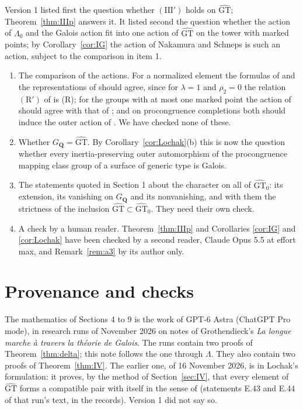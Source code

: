 \documentclass[11pt,a4paper]{article}
\theoremstyle{plain}
\theoremstyle{definition}
\theoremstyle{remark}
\newcommand{\GT}{\widehat{\mathrm{GT}}}
\newcommand{\GTz}{\widehat{\mathrm{GT}}_0}
\newcommand{\GQ}{G_{\mathbf Q}}
\begin{document}
Version 1 listed first the question whether $(\mathrm{III}')$ holds on $\GT$; Theorem~\ref{thm:IIIp} answers it.
It listed second the question whether the action of $\Lambda_0$ and the Galois action fit into one action of $\GT$
on the tower with marked points; by Corollary~\ref{cor:IG} the action of Nakamura and Schneps is such an action,
subject to the comparison in item 1.
\begin{enumerate}
\item The comparison of the actions. For a normalized element the formulas of \cite{HLS} and the representations
of \cite{NS} should agree, since for $\lambda=1$ and $\rho_2=0$ the relation $(\mathrm{R}')$ of \cite[\S1]{NS} is
(R); for the groups with at most one marked point the action of \cite{LNS} should agree with that of \cite{NS}; and
on procongruence completions both should induce the outer action of \cite{Lo}. We have checked none of these.
\item Whether $\GQ=\GT$. By Corollary~\ref{cor:Lochak}(b) this is now the question whether every
inertia-preserving outer automorphism of the procongruence mapping class group of a surface of generic type is
Galois.
\item The statements quoted in Section 1 about the character on all of $\GTz$: its extension, its vanishing on
$\GQ$ and its nonvanishing, and with them the strictness of the inclusion $\GT\subset\GTz$. They need their own
check.
\item A check by a human reader. Theorem~\ref{thm:IIIp} and Corollaries \ref{cor:IG} and \ref{cor:Lochak} have been
checked by a second reader, Claude Opus 5.5 at effort max, and Remark~\ref{rem:a3} by its author only.
\end{enumerate}

\section*{Provenance and checks}

The mathematics of Sections 4 to 9 is the work of GPT-6 Astra (ChatGPT Pro mode), in research runs of November
2026 on notes of Grothendieck's \emph{La longue marche \`a travers la th\'eorie de Galois}. The runs contain two
proofs of Theorem~\ref{thm:delta}; this note follows the one through $\Lambda$. They also contain two proofs of
Theorem~\ref{thm:IV}. The earlier one, of 16 November 2026, is in Lochak's formulation: it proves, by the method of
Section~\ref{sec:IV}, that every element of $\GT$ forms a compatible pair with itself in the sense of
\cite[Definition 5.4]{Lo} (statements E.43 and E.44 of that run's text, in the records). Version 1 did not say
so.
\end{document}
